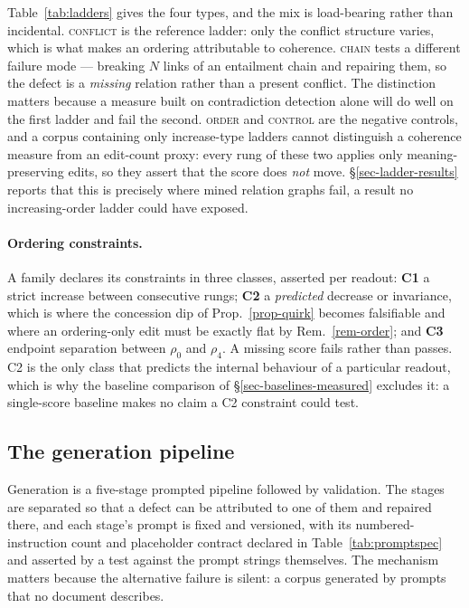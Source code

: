 Table~\ref{tab:ladders} gives the four types, and the mix is load-bearing rather than incidental.
\textsc{conflict} is the reference ladder: only the conflict structure varies, which is what makes an
ordering attributable to coherence. \textsc{chain} tests a different failure mode --- breaking $N$ links
of an entailment chain and repairing them, so the defect is a \emph{missing} relation rather than a
present conflict. The distinction matters because a measure built on contradiction detection alone will
do well on the first ladder and fail the second. \textsc{order} and \textsc{control} are the negative
controls, and a corpus containing only increase-type ladders cannot distinguish a coherence measure from
an edit-count proxy: every rung of these two applies only meaning-preserving edits, so they assert that
the score does \emph{not} move. \S\ref{sec-ladder-results} reports that this is precisely where mined
relation graphs fail, a result no increasing-order ladder could have exposed.

\paragraph{Ordering constraints.} A family declares its constraints in three classes, asserted per
readout: \textbf{C1} a strict increase between consecutive rungs; \textbf{C2} a \emph{predicted} decrease
or invariance, which is where the concession dip of Prop.~\ref{prop-quirk} becomes falsifiable and where
an ordering-only edit must be exactly flat by Rem.~\ref{rem-order}; and \textbf{C3} endpoint separation
between $\rho_0$ and $\rho_4$. A missing score fails rather than passes. C2 is the only class that
predicts the internal behaviour of a particular readout, which is why the baseline comparison of
\S\ref{sec-baselines-measured} excludes it: a single-score baseline makes no claim a C2 constraint could
test.

\subsection{The generation pipeline}
\label{sec-bench-pipeline}

Generation is a five-stage prompted pipeline followed by validation. The stages are separated so that a
defect can be attributed to one of them and repaired there, and each stage's prompt is fixed and
versioned, with its numbered-instruction count and placeholder contract declared in
Table~\ref{tab:promptspec} and asserted by a test against the prompt strings themselves. The mechanism
matters because the alternative failure is silent: a corpus generated by prompts that no document
describes.

